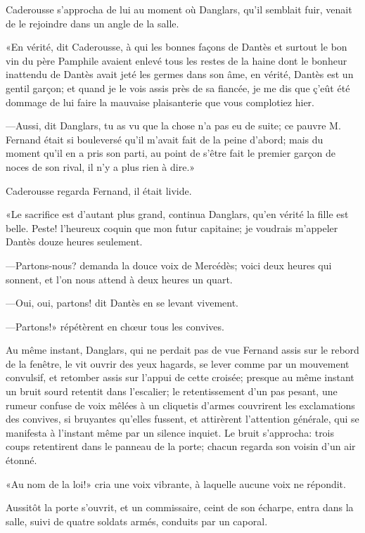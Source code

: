 Caderousse s'approcha de lui au moment où Danglars, qu'il semblait fuir, venait de le rejoindre dans un angle de la salle.

«En vérité, dit Caderousse, à qui les bonnes façons de Dantès et surtout le bon vin du père Pamphile avaient enlevé tous les restes de la haine dont le bonheur inattendu de Dantès avait jeté les germes dans son âme, en vérité, Dantès est un gentil garçon; et quand je le vois assis près de sa fiancée, je me dis que ç'eût été dommage de lui faire la mauvaise plaisanterie que vous complotiez hier.

—Aussi, dit Danglars, tu as vu que la chose n'a pas eu de suite; ce pauvre M. Fernand était si bouleversé qu'il m'avait fait de la peine d'abord; mais du moment qu'il en a pris son parti, au point de s'être fait le premier garçon de noces de son rival, il n'y a plus rien à dire.»

Caderousse regarda Fernand, il était livide.

«Le sacrifice est d'autant plus grand, continua Danglars, qu'en vérité la fille est belle. Peste! l'heureux coquin que mon futur capitaine; je voudrais m'appeler Dantès douze heures seulement.

—Partons-nous? demanda la douce voix de Mercédès; voici deux heures qui sonnent, et l'on nous attend à deux heures un quart.

—Oui, oui, partons! dit Dantès en se levant vivement.

—Partons!» répétèrent en chœur tous les convives.

Au même instant, Danglars, qui ne perdait pas de vue Fernand assis sur le rebord de la fenêtre, le vit ouvrir des yeux hagards, se lever comme par un mouvement convulsif, et retomber assis sur l'appui de cette croisée; presque au même instant un bruit sourd retentit dans l'escalier; le retentissement d'un pas pesant, une rumeur confuse de voix mêlées à un cliquetis d'armes couvrirent les exclamations des convives, si bruyantes qu'elles fussent, et attirèrent l'attention générale, qui se manifesta à l'instant même par un silence inquiet. Le bruit s'approcha: trois coups retentirent dans le panneau de la porte; chacun regarda son voisin d'un air étonné.

«Au nom de la loi!» cria une voix vibrante, à laquelle aucune voix ne répondit.

Aussitôt la porte s'ouvrit, et un commissaire, ceint de son écharpe, entra dans la salle, suivi de quatre soldats armés, conduits par un caporal.

